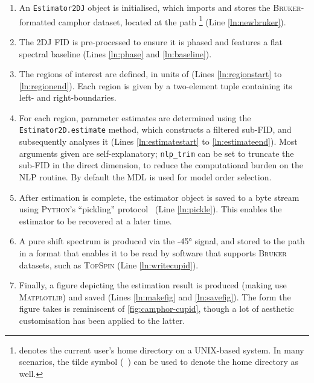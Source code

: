 \begin{enumerate}
    \item An \texttt{Estimator2DJ} object is initialised, which imports and stores
        the \textsc{Bruker}-formatted camphor dataset, located at the path
        \footnote{
             denotes the current user's home directory on a
            UNIX-based system. In many scenarios, the tilde symbol
            (\texttt{~})
            can be used to denote the home directory as well.
        }
        (Line \ref{ln:newbruker}).
    \item The \ac{2DJ} \ac{FID} is pre-processed to ensure it is phased and
        features a flat spectral baseline (Lines \ref{ln:phase} and
        \ref{ln:baseline}).
    \item The regions of interest are defined, in units of
        \unit{\partspermillion} (Lines \ref{ln:regionstart} to
        \ref{ln:regionend}). Each region is given by a two-element tuple
        containing its left- and right-boundaries.
    \item For each region, parameter estimates are determined using the
        \texttt{Estimator2D.estimate} method, which constructs a filtered
        sub-\ac{FID}, and subsequently analyses it (Lines
        \ref{ln:estimatestart} to \ref{ln:estimateend}). Most arguments given
        are self-explanatory; \texttt{nlp_trim} can be set to
        truncate the sub-\ac{FID} in the direct dimension, to reduce the
        computational burden on the \ac{NLP} routine. By default
        the \ac{MDL} is used for model order selection.
    \item After estimation is complete, the estimator object is saved to a byte
        stream using \textsc{Python}'s ``pickling'' protocol~\cite{pickle} (Line
        \ref{ln:pickle}).
        This enables the estimator to be recovered at a later time.
    \item A pure shift spectrum is produced via the \ang{-45} signal, and
        stored to the path  in a format that enables
        it to be read by software that supports \textsc{Bruker} datasets,
        such as \textsc{TopSpin} (Line \ref{ln:writecupid}).
    \item Finally, a figure depicting the estimation result is produced (making
        use \textsc{Matplotlib}) and saved (Lines \ref{ln:makefig} and
        \ref{ln:savefig}). The form the figure takes is reminiscent of
        \cref{fig:camphor-cupid}, though a lot of aesthetic customisation has
        been applied to the latter.
\end{enumerate}
